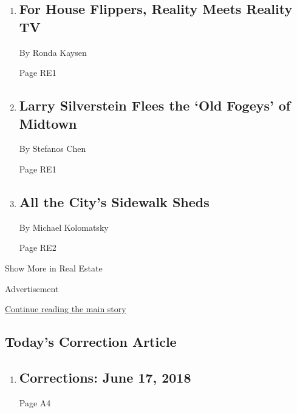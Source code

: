 \begin{enumerate}
\def\labelenumi{\arabic{enumi}.}
\item
  \href{/2018/06/15/realestate/for-house-flippers-reality-meets-reality-tv.html}{}

  \hypertarget{for-house-flippers-reality-meets-reality-tv}{%
  \subsection{For House Flippers, Reality Meets Reality
  TV}\label{for-house-flippers-reality-meets-reality-tv}}

  By Ronda Kaysen

  Page RE1
\item
  \href{/2018/06/15/realestate/larry-silverstein-flees-the-old-fogeys-of-midtown.html}{}

  \hypertarget{larry-silverstein-flees-the-old-fogeys-of-midtown}{%
  \subsection{Larry Silverstein Flees the `Old Fogeys' of
  Midtown}\label{larry-silverstein-flees-the-old-fogeys-of-midtown}}

  By Stefanos Chen

  Page RE1
\item
  \href{/2018/06/14/realestate/sidewalk-construction-sheds-daily-count.html}{}

  \hypertarget{all-the-citys-sidewalk-sheds}{%
  \subsection{All the City's Sidewalk
  Sheds}\label{all-the-citys-sidewalk-sheds}}

  By Michael Kolomatsky

  Page RE2
\end{enumerate}

Show More in Real Estate

Advertisement

\protect\hyperlink{after-mid8}{Continue reading the main story}

\hypertarget{todays-correction-article}{%
\subsection{Today's Correction
Article}\label{todays-correction-article}}

\begin{enumerate}
\def\labelenumi{\arabic{enumi}.}
\item
  \href{/2018/06/16/pageoneplus/corrections-june-17-2018.html}{}

  \hypertarget{corrections-june-17-2018}{%
  \subsection{Corrections: June 17,
  2018}\label{corrections-june-17-2018}}

  Page A4
\end{enumerate}


